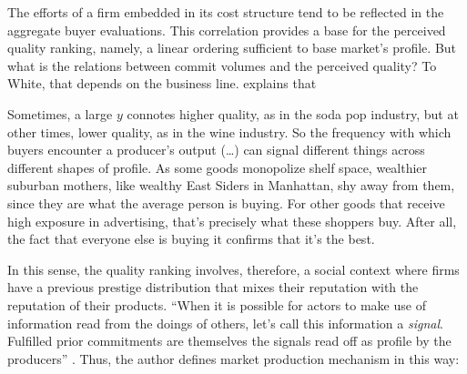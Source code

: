 \documentclass[a4paper, 12pt, openright, oneside, german, french, brazil, english, article]{abntex2}
\begin{document}
	The efforts of a firm embedded in its cost structure tend to be reflected in the aggregate buyer evaluations. This correlation provides a base for the perceived quality ranking, namely, a linear ordering sufficient to base market's profile. But what is the relations between commit volumes and the perceived quality? To White, that depends on the business line.  explains that
	
	
	\begin{citacao}
		Sometimes, a large $y$ connotes higher quality, as in the soda pop industry, but at other times, lower quality, as in the wine industry. So the frequency with which buyers encounter a producer's output (\dots) can signal different things across different shapes of profile. As some goods monopolize shelf space, wealthier suburban mothers, like wealthy East Siders in Manhattan, shy away from them, since they are what the average person is buying. For other goods that receive high exposure in advertising, that's precisely what these shoppers buy. After all, the fact that everyone else is buying it confirms that it's the best. \cite[p. 15]{white2002markets}
	\end{citacao}
	
	
	In this sense, the quality ranking involves, therefore, a social context where firms have a previous prestige distribution that mixes their reputation with the reputation of their products. ``When it is possible for actors to make use of information read from the doings of others, let's call this information a \textit{signal}. Fulfilled prior commitments are themselves the signals read off as profile by the producers'' \cite[p. 16]{white2002markets}. Thus, the author defines market production mechanism in this way:
	
\end{document}
